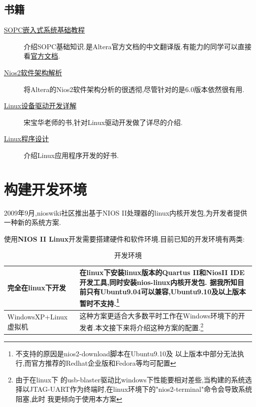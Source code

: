 \documentclass[12pt,a4paper,titlepage]{article}
\begin{document}
\subsection{书籍}
\begin{description}
\item[\href{http://www.amazon.cn/mn/detailApp/ref=sr\_1\_1?\_encoding=UTF8&s=books&qid=1291516849&asin=B001EJNTCC&sr=8-1}{SOPC嵌入式系统基础教程}] 介绍SOPC基础知识.是Altera官方文档的中文翻译版.有能力的同学可以直接看\href{http://www.altera.com.cn/literature/lit-nio2.jsp}{官方文档}.
\item[\href{http://www.amazon.cn/Nios-2\%E8\%BD\%AF\%E4\%BB\%B6\%E6\%9E\%B6\%E6\%9E\%84\%E8\%A7\%A3\%E6\%9E\%90-\%E8\%94\%A1\%E4\%BC\%9F\%E7\%BA\%B2/dp/B0011Y1VXO/ref=pd\_sim\_b\_2}{Nios2软件架构解析}] 将Altera的Nios2软件架构分析的很透彻,尽管针对的是6.0版本依然很有用.
\item[\href{http://www.amazon.cn/mn/detailApp/ref=sr\_1\_1?\_encoding=UTF8&s=books&qid=1291517188&asin=B004A7L87I&sr=1-1}
{Linux设备驱动开发详解}] 宋宝华老师的书,针对Linux驱动开发做了详尽的介绍.
\item[\href{http://www.amazon.cn/mn/detailApp/ref=sr\_1\_1?\_encoding=UTF8&s=books&qid=1291517330&asin=B003Q97NPC&sr=1-1}{Linux程序设计}]
 介绍Linux应用程序开发的好书.
\end{description}
\newpage{}
\section{构建开发环境}
2009年9月,nioswiki社区推出基于NIOS II处理器的linux内核开发包,为开发者提供一种新的系统方案.

使用\textbf{NIOS II Linux}开发需要搭建硬件和软件环境.目前已知的开发环境有两类:
\begin{table}[!hbtp]
\centering
\begin{tabular}{|l|p{}|}
\hline
完全在linux下开发 & 在linux下安装linux版本的Quartus II和NiosII IDE开发工具,同时安装nios-linux内核开发包.
据我所知目前只有\textbf{Ubuntu9.04}可以兼容,Ubuntu9.10及以上版本暂时不支持.\footnote{不支持的原因是nios2-download脚本在Ubuntu9.10及
以上版本中部分无法执行,而官方推荐的Redhat企业版和Fedora等均可配置}\\
\hline
WindowsXP+Linux虚拟机 & 这种方案更适合大多数平时工作在Windows环境下的开发者.本文接下来将介绍这种方案的配置.\footnote{由于在linux下
的usb-blaster驱动比windows下性能要相对差些,当构建的系统选择以JTAG-UART作为终端时,在linux环境下的"nios2-terminal"命令会导致系统阻塞,此时
我更倾向于使用本方案}\\
\hline
\end{tabular}
\caption{开发环境\label{dev_env}}
\end{table}
\end{document}
